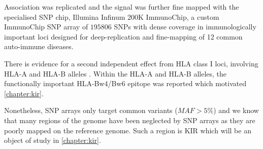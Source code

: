 
Association was replicated and the signal was further fine mapped with the specialised SNP chip, Illumina Infinum 200K ImmunoChip, a custom ImmunoChip SNP array
of $195806$ SNPs with dense coverage in immunologically important loci designed for deep-replication and fine-mapping of 12 common auto-immune diseases.

There is evidence for a second independent effect from HLA class I loci,
involving HLA-A and HLA-B alleles \citep{Todd:2010bl}.
Within the HLA-A and HLA-B alleles,
the functionally important HLA-Bw4/Bw6 epitope \citep{Nejentsev:2007dv} was reported which motivated \cref{chapter:kir}.

Nonetheless, SNP arrays only target common variants ($MAF > 5\%$) and
we know that many regions of the genome have been neglected by SNP arrays as they are poorly mapped on the reference genome.
Such a region is KIR which will be an object of study in \cref{chapter:kir}.







